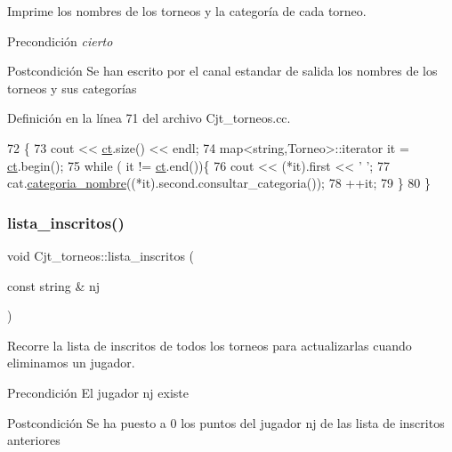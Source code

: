 Imprime los nombres de los torneos y la categoría de cada torneo. 

\begin{DoxyPrecond}{Precondición}
{\itshape cierto} 
\end{DoxyPrecond}
\begin{DoxyPostcond}{Postcondición}
Se han escrito por el canal estandar de salida los nombres de los torneos y sus categorías 
\end{DoxyPostcond}


Definición en la línea 71 del archivo Cjt\+\_\+torneos.\+cc.


\begin{DoxyCode}
72 \{
73     cout << \hyperlink{class_cjt__torneos_a701df4fc4fbd2d6ffa081a01845083f3}{ct}.size() << endl;
74     map<string,Torneo>::iterator it = \hyperlink{class_cjt__torneos_a701df4fc4fbd2d6ffa081a01845083f3}{ct}.begin();
75     \textcolor{keywordflow}{while} ( it != \hyperlink{class_cjt__torneos_a701df4fc4fbd2d6ffa081a01845083f3}{ct}.end())\{
76         cout << (*it).first << \textcolor{charliteral}{' '};
77         cat.\hyperlink{class_cjt__categorias_a1b0f9a447879796a42ee0dac753f8779}{categoria\_nombre}((*it).second.consultar\_categoria());
78         ++it;
79     \}  
80 \}
\end{DoxyCode}
\mbox{\label{class_cjt__torneos_a6acf54664dd8dd524d9f9671e83b181b}} 
\subsubsection{\texorpdfstring{lista\+\_\+inscritos()}{lista\_inscritos()}}
{\footnotesize\ttfamily void Cjt\+\_\+torneos\+::lista\+\_\+inscritos (\begin{DoxyParamCaption}\item[{const string \&}]{nj }\end{DoxyParamCaption})}



Recorre la lista de inscritos de todos los torneos para actualizarlas cuando eliminamos un jugador. 

\begin{DoxyPrecond}{Precondición}
El jugador nj existe 
\end{DoxyPrecond}
\begin{DoxyPostcond}{Postcondición}
Se ha puesto a 0 los puntos del jugador nj de las lista de inscritos anteriores 
\end{DoxyPostcond}


